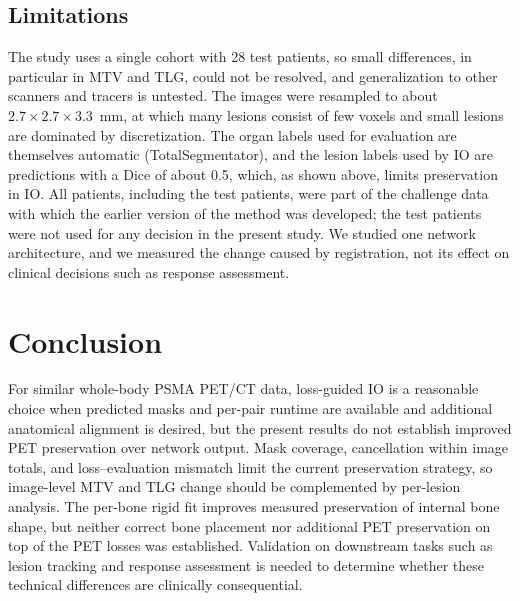 \subsection{Limitations}
The study uses a single cohort with 28 test patients, so small differences, in particular in MTV and TLG, could not be resolved, and generalization to other scanners and tracers is untested.
The images were resampled to about $2.7\times2.7\times3.3$~mm, at which many lesions consist of few voxels and small lesions are dominated by discretization.
The organ labels used for evaluation are themselves automatic (TotalSegmentator), and the lesion labels used by IO are predictions with a Dice of about 0.5, which, as shown above, limits preservation in IO.
All patients, including the test patients, were part of the challenge data with which the earlier version of the method was developed; the test patients were not used for any decision in the present study.
We studied one network architecture, and we measured the change caused by registration, not its effect on clinical decisions such as response assessment.

\section{Conclusion}
\label{sect:conclusion}

For similar whole-body PSMA PET/CT data, loss-guided IO is a reasonable choice when predicted masks and per-pair runtime are available and additional anatomical alignment is desired, but the present results do not establish improved PET preservation over network output.
Mask coverage, cancellation within image totals, and loss--evaluation mismatch limit the current preservation strategy, so image-level MTV and TLG change should be complemented by per-lesion analysis.
The per-bone rigid fit improves measured preservation of internal bone shape, but neither correct bone placement nor additional PET preservation on top of the PET losses was established.
Validation on downstream tasks such as lesion tracking and response assessment is needed to determine whether these technical differences are clinically consequential.
